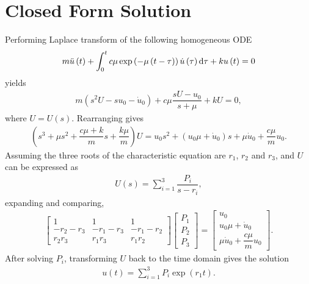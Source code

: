 \appendix
\section{Closed Form Solution}\label{sec:analytical_sdof}
Performing Laplace transform of the following homogeneous ODE
\begin{gather}\label{eq:single_exp}
m\ddot{u}\left(t\right)+\int_0^tc\mu\exp\left(-\mu\left(t-\tau\right)\right)\dot{u}\left(\tau\right)\mathrm{d}\tau+ku\left(t\right)=0
\end{gather}
yields
\begin{gather}
m\left(s^2U-su_0-\dot{u}_0\right)
+c\mu\dfrac{sU-u_0}{s+\mu}
+kU
=0,
\end{gather}
where $U=U\left(s\right)$. Rearranging gives
\begin{gather}
\left(
s^3
+\mu{}s^2
+\dfrac{c\mu+k}{m}s
+\dfrac{k\mu}{m}\right)U
=
u_0s^2
+\left(u_0\mu+\dot{u}_0\right)s
+\mu\dot{u}_0
+\dfrac{c\mu{}}{m}u_0.
\end{gather}
Assuming the three roots of the characteristic equation are $r_1$, $r_2$ and $r_3$, and $U$ can be expressed as
\begin{gather}
U\left(s\right)=\sum_{i=1}^3\dfrac{P_i}{s-r_i},
\end{gather}
expanding and comparing,
\begin{gather}
\begin{bmatrix}
1&1&1\\
-r_2-r_3&-r_1-r_3&-r_1-r_2\\
r_2r_3&r_1r_3&r_1r_2
\end{bmatrix}
\begin{bmatrix}
P_1\\P_2\\P_3
\end{bmatrix}
=
\begin{bmatrix}
u_0\\u_0\mu+\dot{u}_0\\\mu\dot{u}_0
+\dfrac{c\mu{}}{m}u_0
\end{bmatrix}.
\end{gather}
After solving $P_i$, transforming $U$ back to the time domain gives the solution
\begin{gather}
u(t)=\sum_{i=1}^3P_i\exp\left(r_1t\right).
\end{gather}
